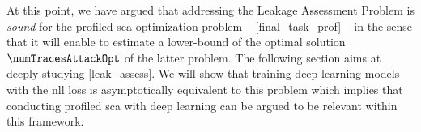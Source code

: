 At this point, we have argued that addressing the Leakage Assessment Problem is \textit{sound} for the profiled \gls{sca} optimization problem -- \ie{} \autoref{final_task_prof} -- in the sense that it will enable to estimate a lower-bound of the optimal solution \(\numTracesAttackOpt\) of the latter problem.
The following section aims at deeply studying \autoref{leak_assess}.
We will show that training deep learning models with the \gls{nll} loss is asymptotically equivalent to this problem which implies that conducting profiled \gls{sca} with deep learning can be argued to be relevant within this framework.